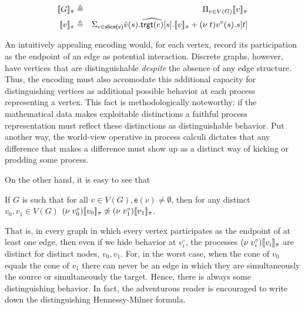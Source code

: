 \documentclass[]{llncs}
\begin{document}

\begin{eqnarray}
  \meaningof{G}_{\pi} & \triangleq & \Pi_{v \in V(G)}\meaningof{v}_{\pi} \\
  \meaningof{v}_{\pi} & \triangleq & \Sigma_{e \in \textsf{slice(v)}} \hat{v}(s).\widehat{\textsf{trgt}(e)}[s].\meaningof{v}_{\pi} + (\nu \; t)v^{\circ}(s).s[t]
\end{eqnarray}

\begin{remark}
  An intuitively appealing encoding would, for each vertex, record its
  participation as the endpoint of an edge as potential
  interaction. Discrete graphs, however, have vertices that are
  distinguishable \emph{despite} the absence of any edge
  structure. Thus, the encoding must also accomodate this additional
  capacity for distinguishing vertices as additional possible behavior
  at each process representing a vertex. This fact is methodologically
  noteworthy: if the mathematical data makes exploitable distinctions
  a faithful process representation must reflect these distinctions as
  distinguishable behavior. Put another way, the world-view operative
  in process calculi dictates that any difference that makes a
  difference must show up as a distinct way of kicking or prodding
  some process.   
\end{remark}

On the other hand, it is easy to see that

\begin{lemma}
  If $G$ is such that for all $v \in V(G), \textsf{e}(v) \neq
  \emptyset$, then for any distinct $v_0, v_1 \in V(G)$ $(\nu \;
  v_0^{\circ})[\![ v_0 ]\!]_{\pi} \not\simeq (\nu \;
  v_1^{\circ})[\![ v_1 ]\!]_{\pi}$.
\end{lemma}

That is, in every graph in which every vertex participates as the
endpoint of at least one edge, then even if we hide behavior at
$v_i^{\circ}$, the processes $(\nu \;
v_i^{\circ})[\![ v_i ]\!]_{\pi}$ are distinct for distinct nodes,
$v_0, v_1$. For, in the worst case, when the cone of $v_0$ equals the
cone of $v_1$ there can never be an edge in which they are
simultaneously the source or simultaneously the target. Hence, there
is always some distinguishing behavior. In fact, the adventurous
reader is encouraged to write down the distinguishing Hennessy-Milner
formula.
\end{document}
